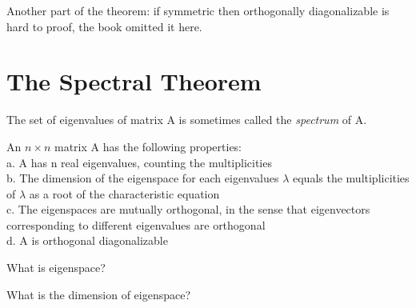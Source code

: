 Another part of the theorem: if symmetric then orthogonally diagonalizable is hard to proof, the book omitted it here.


\section{The Spectral Theorem}

The set of eigenvalues of matrix A is sometimes called the \textit{spectrum} of A.

\begin{theorem}
An \(n \times n\) matrix A has the following properties:
\\
a. A has n real eigenvalues, counting the multiplicities
\\
b. The dimension of the eigenspace for each eigenvalues \(\lambda \) equals the multiplicities of \(\lambda \) as a root of the characteristic equation
\\
c. The eigenspaces are mutually orthogonal, in the sense that eigenvectors corresponding to different eigenvalues are orthogonal
\\
d. A is orthogonal diagonalizable
\end{theorem}

\begin{remark}
    What is eigenspace?
\end{remark}


\begin{remark}
    What is the dimension of eigenspace?
\end{remark}